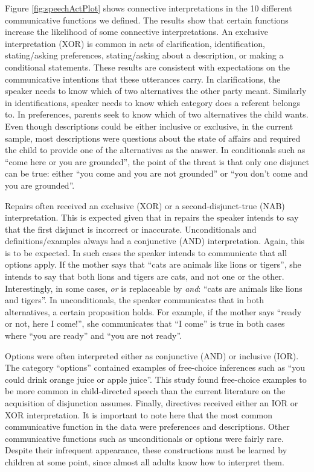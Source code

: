 \documentclass[,man,floatsintext]{apa6}
\begin{document}
Figure \ref{fig:speechActPlot} shows connective interpretations in the 10 different communicative functions we defined. The results show that certain functions increase the likelihood of some connective interpretations. An exclusive interpretation (XOR) is common in acts of clarification, identification, stating/asking preferences, stating/asking about a description, or making a conditional statements. These results are consistent with expectations on the communicative intentions that these utterances carry. In clarifications, the speaker needs to know which of two alternatives the other party meant. Similarly in identifications, speaker needs to know which category does a referent belongs to. In preferences, parents seek to know which of two alternatives the child wants. Even though descriptions could be either inclusive or exclusive, in the current sample, most descriptions were questions about the state of affairs and required the child to provide one of the alternatives as the answer. In conditionals such as \enquote{come here or you are grounded}, the point of the threat is that only one disjunct can be true: either \enquote{you come and you are not grounded} or \enquote{you don't come and you are grounded}.

Repairs often received an exclusive (XOR) or a second-disjunct-true (NAB) interpretation. This is expected given that in repairs the speaker intends to say that the first disjunct is incorrect or inaccurate. Unconditionals and definitions/examples always had a conjunctive (AND) interpretation. Again, this is to be expected. In such cases the speaker intends to communicate that all options apply. If the mother says that \enquote{cats are animals like lions or tigers}, she intends to say that both lions and tigers are cats, and not one or the other. Interestingly, in some cases, \emph{or} is replaceable by \emph{and}: \enquote{cats are animals like lions and tigers}. In unconditionals, the speaker communicates that in both alternatives, a certain proposition holds. For example, if the mother says \enquote{ready or not, here I come!}, she communicates that \enquote{I come} is true in both cases where \enquote{you are ready} and \enquote{you are not ready}.

Options were often interpreted either as conjunctive (AND) or inclusive (IOR). The category \enquote{options} contained examples of free-choice inferences such as \enquote{you could drink orange juice or apple juice}. This study found free-choice examples to be more common in child-directed speech than the current literature on the acquisition of disjunction assumes. Finally, directives received either an IOR or XOR interpretation. It is important to note here that the most common communicative function in the data were preferences and descriptions. Other communicative functions such as unconditionals or options were fairly rare. Despite their infrequent appearance, these constructions must be learned by children at some point, since almost all adults know how to interpret them.
\end{document}
